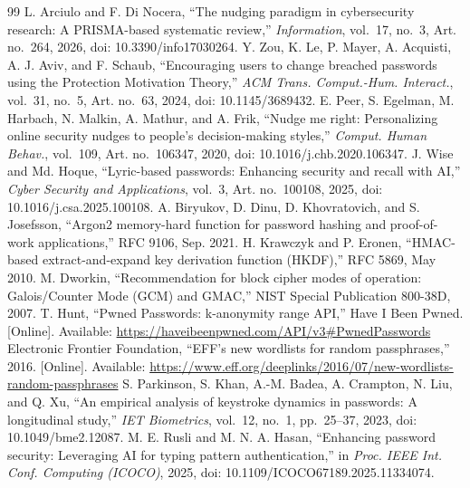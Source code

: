 \documentclass[conference]{IEEEtran}
\begin{document}
\begin{thebibliography}{99}
 L. Arciulo and F. Di Nocera, ``The nudging paradigm in cybersecurity research: A PRISMA-based systematic review,'' \emph{Information}, vol.~17, no.~3, Art. no.~264, 2026, doi: 10.3390/info17030264.
 Y. Zou, K. Le, P. Mayer, A. Acquisti, A. J. Aviv, and F. Schaub, ``Encouraging users to change breached passwords using the Protection Motivation Theory,'' \emph{ACM Trans. Comput.-Hum. Interact.}, vol.~31, no.~5, Art. no.~63, 2024, doi: 10.1145/3689432.
 E. Peer, S. Egelman, M. Harbach, N. Malkin, A. Mathur, and A. Frik, ``Nudge me right: Personalizing online security nudges to people's decision-making styles,'' \emph{Comput. Human Behav.}, vol.~109, Art. no.~106347, 2020, doi: 10.1016/j.chb.2020.106347.
 J. Wise and Md. Hoque, ``Lyric-based passwords: Enhancing security and recall with AI,'' \emph{Cyber Security and Applications}, vol.~3, Art. no.~100108, 2025, doi: 10.1016/j.csa.2025.100108.
 A. Biryukov, D. Dinu, D. Khovratovich, and S. Josefsson, ``Argon2 memory-hard function for password hashing and proof-of-work applications,'' RFC 9106, Sep. 2021.
 H. Krawczyk and P. Eronen, ``HMAC-based extract-and-expand key derivation function (HKDF),'' RFC 5869, May 2010.
 M. Dworkin, ``Recommendation for block cipher modes of operation: Galois/Counter Mode (GCM) and GMAC,'' NIST Special Publication 800-38D, 2007.
 T. Hunt, ``Pwned Passwords: k-anonymity range API,'' Have I Been Pwned. [Online]. Available: \url{https://haveibeenpwned.com/API/v3#PwnedPasswords}
 Electronic Frontier Foundation, ``EFF's new wordlists for random passphrases,'' 2016. [Online]. Available: \url{https://www.eff.org/deeplinks/2016/07/new-wordlists-random-passphrases}
 S. Parkinson, S. Khan, A.-M. Badea, A. Crampton, N. Liu, and Q. Xu, ``An empirical analysis of keystroke dynamics in passwords: A longitudinal study,'' \emph{IET Biometrics}, vol.~12, no.~1, pp.~25--37, 2023, doi: 10.1049/bme2.12087.
 M. E. Rusli and M. N. A. Hasan, ``Enhancing password security: Leveraging AI for typing pattern authentication,'' in \emph{Proc. IEEE Int. Conf. Computing (ICOCO)}, 2025, doi: 10.1109/ICOCO67189.2025.11334074.
\end{thebibliography}
\end{document}
